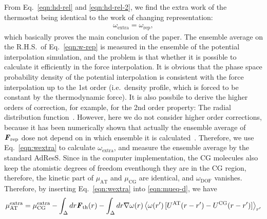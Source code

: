 \documentclass[a4paper,preprint,unsortedaddress]{revtex4-1}
\newcommand{\vect}[1]{\textbf{\textit{#1}}}
\newcommand{\dof}{{\textrm{DOF}}}
\newcommand{\AT}{{\textrm{{AT}}}}
\newcommand{\CG}{{\textrm{CG}}}
\newcommand{\HY}{{\Delta}}
\newcommand{\thf}{{\textrm{th}}}
\newcommand{\res}{{\textrm{rep}}}
\newcommand{\ext}{{\textrm{extra}}}
\begin{document}
From Eq.~\eqref{eqn:hd-rel} and \eqref{eqn:hd-rel-2}, we
find the extra work of the thermostat being identical to the work of changing
representation:
\begin{align}\label{eqn:wextra}
  \omega_\ext = \omega_\res,
\end{align}
which basically proves the main conclusion of the paper.  The ensemble
average on the R.H.S.~of Eq.~\eqref{eqn:w-rep} is measured in the
ensemble of the potential interpolation simulation, and the problem is
that whether it is possible to calculate it efficiently in the force
interpolation.  It is obvious that the phase space probability density
of the potential interpolation is consistent with the force
interpolation up to the 1st order (i.e.~density profile, which is
forced to be constant by the thermodynamic force).  It is also
possbile to derive the higher orders of correction, for example, for
the 2nd order property: The radial distribution function~\cite{jctchan}.
However, here we do not consider higher order corrections, because it
has been numerically shown that actually the ensemble average of
$\vect F_\res$ dose not depend on in which ensemble it is
calculated~\cite{prx}. Therefore, we use Eq.~\eqref{eqn:wextra} to
calculate $\omega_\ext$, and measure the ensemble average by the
standard AdResS.  Since in the computer implementation, the CG
molecules also keep the atomistic degrees of freedom eventhough they
are in the CG region, therefore, the kinetic part of $\mu_\AT$ and
$\mu_\CG$ are identical, and $\omega_\dof$ vanishes. Therefore,
by inserting Eq.~\eqref{eqn:wextra} into \eqref{eqn:mueq-d}, we have
\begin{align}
  \mu_\AT^\ext = \mu_\CG^\ext - \int_\HY dr \vect F_\thf(r)
  -\int_\HY dr \nabla\omega(r)\,\big\langle \omega(r')\, [U^\AT(r-r') - U^\CG(r-r')]\big\rangle_{r'}
\end{align}
\end{document}
